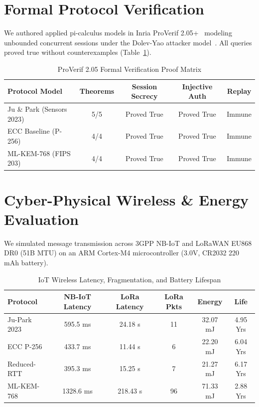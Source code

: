 \documentclass[journal,10pt,twocolumn]{IEEEtran}
\begin{document}
\section{Formal Protocol Verification}
We authored applied pi-calculus models in Inria ProVerif 2.05+~\cite{proverif2016} modeling unbounded concurrent sessions under the Dolev-Yao attacker model~\cite{dolev1983}. All queries proved true without counterexamples (Table~\ref{tab:formal}).

\begin{table}[htbp]
\caption{ProVerif 2.05 Formal Verification Proof Matrix}
\begin{center}
\begin{tabular}{lcccc}
\toprule
\textbf{Protocol Model} & \textbf{Theorems} & \textbf{Session Secrecy} & \textbf{Injective Auth} & \textbf{Replay} \\
\midrule
Ju \& Park (Sensors 2023) & 5/5 & Proved True & Proved True & Immune \\
ECC Baseline (P-256) & 4/4 & Proved True & Proved True & Immune \\
ML-KEM-768 (FIPS 203) & 4/4 & Proved True & Proved True & Immune \\
\bottomrule
\end{tabular}
\label{tab:formal}
\end{center}
\end{table}

\section{Cyber-Physical Wireless \& Energy Evaluation}
We simulated message transmission across 3GPP NB-IoT and LoRaWAN EU868 DR0 (51B MTU) on an ARM Cortex-M4 microcontroller (3.0V, CR2032 220 mAh battery).

\begin{table}[htbp]
\caption{IoT Wireless Latency, Fragmentation, and Battery Lifespan}
\begin{center}
\begin{tabular}{lccccc}
\toprule
\textbf{Protocol} & \textbf{NB-IoT Latency} & \textbf{LoRa Latency} & \textbf{LoRa Pkts} & \textbf{Energy} & \textbf{Life} \\
\midrule
Ju-Park 2023 & 595.5 ms & 24.18 s & 11 & 32.07 mJ & 4.95 Yrs \\
ECC P-256 & 433.7 ms & 11.44 s & 6 & 22.20 mJ & 6.04 Yrs \\
Reduced-RTT & 395.3 ms & 15.25 s & 7 & 21.27 mJ & 6.17 Yrs \\
ML-KEM-768 & 1328.6 ms & 218.43 s & 96 & 71.33 mJ & 2.88 Yrs \\
\bottomrule
\end{tabular}
\label{tab:wireless}
\end{center}
\end{table}
\end{document}
